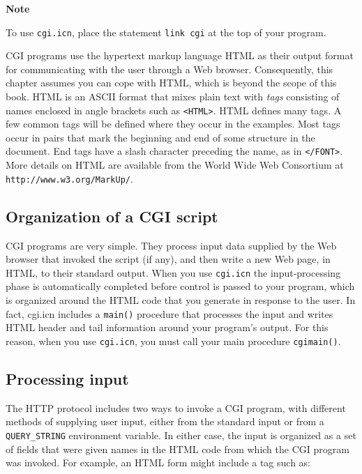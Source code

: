 {\sffamily\bfseries Note}

{\sffamily To use \texttt{cgi.icn}, place the statement \texttt{link cgi}
at the top of your program.

CGI programs use the hypertext markup language HTML as their output
format for communicating with the user through a Web browser.
Consequently, this chapter assumes you can cope with HTML, which is
beyond the scope of this book. HTML is an ASCII format that mixes plain
text with \textit{tags} consisting of names enclosed in angle brackets
such as \texttt{{\textless}HTML{\textgreater}}. HTML defines many tags.
A few common tags will be defined where they occur in the examples.
Most tags occur in pairs that mark the beginning and end of some
structure in the document. End tags have a slash character preceding
the name, as in \texttt{{\textless}/FONT{\textgreater}}. More details
on HTML are available from the World Wide Web Consortium at
\texttt{http://www.w3.org/MarkUp/}.

\subsection{Organization of a CGI script}

CGI programs are very simple. They process input data supplied by the
Web browser that invoked the script (if any), and then write a new Web
page, in HTML, to their standard output. When you use \texttt{cgi.icn}
the input-processing phase is automatically completed before control is
passed to your program, which is organized around the HTML code that
you generate in response to the user. In fact, cgi.icn includes a
\texttt{main()} procedure that processes the input and writes HTML
header and tail information around your program's
output. For this reason,
when you use \texttt{cgi.icn}, you must call your main procedure
\texttt{cgimain()}.

\subsection{Processing input}

The HTTP protocol includes two ways to invoke a CGI program,
with different methods of supplying user input, either from the
standard input or from a \texttt{QUERY\_STRING} environment variable.
In either case, the input is organized as a set of fields that were
given names in the HTML code from which the CGI program was invoked.
For example, an HTML form might include a tag such as: 

}
